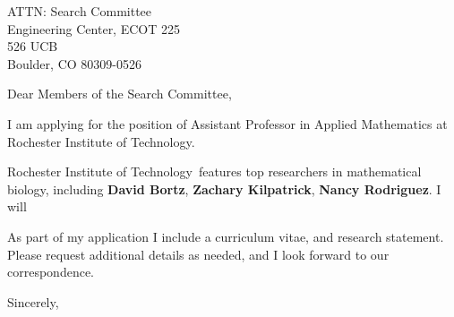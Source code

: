 \documentclass[11pt,a4paper]{letter}
\begin{document}

\def\School{Rochester Institute of Technology}

\begin{letter}
{ATTN: Search Committee\\
Engineering Center, ECOT 225\\
526 UCB\\
Boulder, CO 80309-0526
}


\opening{Dear Members of the Search Committee,}

I am applying for the position of Assistant Professor in Applied Mathematics at \School. 



\School~features top researchers in mathematical biology, including \textbf{David Bortz}, \textbf{Zachary Kilpatrick}, \textbf{Nancy Rodriguez}. I will 



As part of my application I include a curriculum vitae, and research statement. Please request additional details as needed, and I look forward to our correspondence.

\closing{Sincerely,}
\end{letter}
\end{document}

